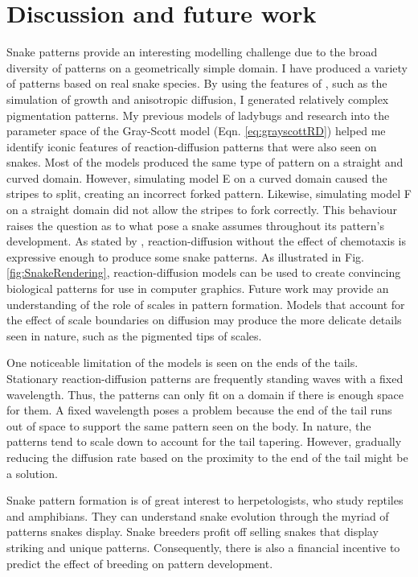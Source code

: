 \newpage
{}

\section{Discussion and future work}
Snake patterns provide an interesting modelling challenge due to the broad diversity of patterns on a geometrically simple domain. I have produced a variety of patterns based on real snake species. By using the features of \ProgramName{}, such as the simulation of growth and anisotropic diffusion, I generated relatively complex pigmentation patterns. My previous models of ladybugs and research into the parameter space of the Gray-Scott model (Eqn. \ref{eq:grayscottRD}) helped me identify iconic features of reaction-diffusion patterns that were also seen on snakes. Most of the models produced the same type of pattern on a straight and curved domain. However, simulating model E on a curved domain caused the stripes to split, creating an incorrect forked pattern. Likewise, simulating model F on a straight domain did not allow the stripes to fork correctly. This behaviour raises the question as to what pose a snake assumes throughout its pattern's development. As stated by \citet{murray1991}, reaction-diffusion without the effect of chemotaxis is expressive enough to produce some snake patterns. As illustrated in Fig. \ref{fig:SnakeRendering}, reaction-diffusion models can be used to create convincing biological patterns for use in computer graphics. Future work may provide an understanding of the role of scales in pattern formation. Models that account for the effect of scale boundaries on diffusion may produce the more delicate details seen in nature, such as the pigmented tips of scales. 

One noticeable limitation of the models is seen on the ends of the tails. Stationary reaction-diffusion patterns are frequently standing waves with a fixed wavelength. Thus, the patterns can only fit on a domain if there is enough space for them. A  fixed wavelength poses a problem because the end of the tail runs out of space to support the same pattern seen on the body. In nature, the patterns tend to scale down to account for the tail tapering. However, gradually reducing the diffusion rate based on the proximity to the end of the tail might be a solution.

Snake pattern formation is of great interest to herpetologists, who study reptiles and amphibians. They can understand snake evolution through the myriad of patterns snakes display. Snake breeders profit off selling snakes that display striking and unique patterns. Consequently, there is also a financial incentive to predict the effect of breeding on pattern development.

